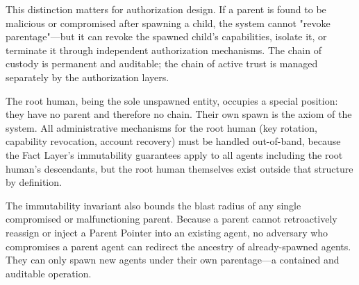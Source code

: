 This distinction matters for authorization design. If a parent is found to be malicious or compromised after spawning a child, the system cannot "revoke parentage"—but it can revoke the spawned child's capabilities, isolate it, or terminate it through independent authorization mechanisms. The chain of custody is permanent and auditable; the chain of active trust is managed separately by the authorization layers.

The root human, being the sole unspawned entity, occupies a special position: they have no parent and therefore no chain. Their own spawn is the axiom of the system. All administrative mechanisms for the root human (key rotation, capability revocation, account recovery) must be handled out-of-band, because the Fact Layer's immutability guarantees apply to all agents including the root human's descendants, but the root human themselves exist outside that structure by definition.

The immutability invariant also bounds the blast radius of any single compromised or malfunctioning parent. Because a parent cannot retroactively reassign or inject a Parent Pointer into an existing agent, no adversary who compromises a parent agent can redirect the ancestry of already-spawned agents. They can only spawn new agents under their own parentage—a contained and auditable operation.


